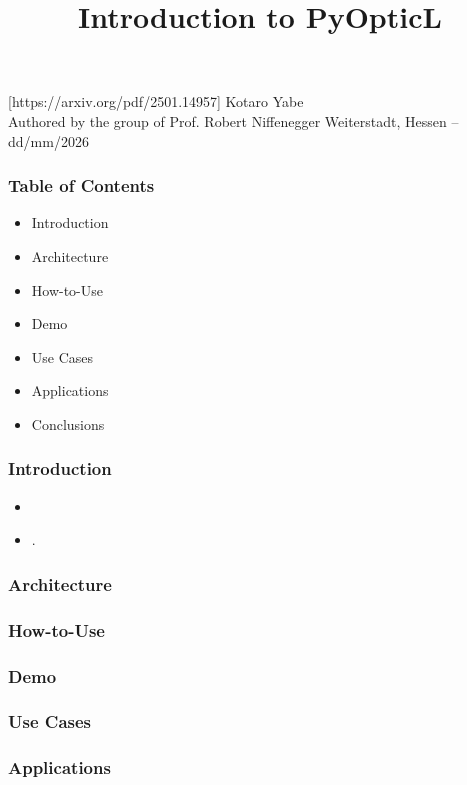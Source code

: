 \documentclass[11pt,xcolor={dvipsnames},usepdftitle=false]{beamer}
\begin{document}
\title{Introduction to PyOpticL}

\information%
%
[https://arxiv.org/pdf/2501.14957]
%
{Kotaro Yabe\\ Authored by the group of Prof. Robert Niffenegger}
%
{Weiterstadt, Hessen -- dd/mm/2026}

\frame{\titlepage}

\begin{frame}
    \frametitle{Table of Contents}
    \begin{itemize}
        \item Introduction
        \item Architecture
        \item How-to-Use
        \item Demo
        \item Use Cases 
        \item Applications
        \item Conclusions
    \end{itemize}
\end{frame}


\begin{frame}
    \frametitle{Introduction}
    \begin{itemize}
        \item 
        \item .
    \end{itemize}
\end{frame}

\begin{frame}
    \frametitle{Architecture}
\end{frame}

\begin{frame}
    \frametitle{How-to-Use}
\end{frame}

\begin{frame}
    \frametitle{Demo}
\end{frame}

\begin{frame}
    \frametitle{Use Cases}
\end{frame}

\begin{frame}
    \frametitle{Applications}
\end{frame}
\end{document}
